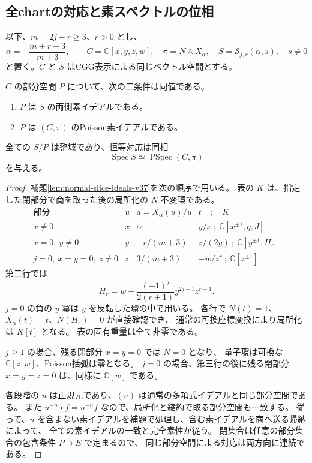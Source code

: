 \subsection{全chartの対応と素スペクトルの位相}

以下、$m=2j+r\ge3$、$r>0$ とし、
\[
 \alpha=-\frac{m+r+3}{m+3},\qquad
 C=\mathbb C[x,y,z,w],\quad
 \pi=N\wedge X_\alpha,\quad S=\mathcal S_{j,r}(\alpha,s),\quad s\ne0
\]
と置く。$C$ と $S$ はCGG表示による同じベクトル空間とする。

\begin{theorem}[素スペクトルの同一視]
\label{thm:prime-poisson-correspondence-v37}
$C$ の部分空間 $P$ について、次の二条件は同値である。
\begin{enumerate}
\item $P$ は $S$ の両側素イデアルである。
\item $P$ は $(C,\pi)$ のPoisson素イデアルである。
\end{enumerate}
全ての $S/P$ は整域であり、恒等対応は同相
\[
 \operatorname{Spec}S\simeq\operatorname{PSpec}(C,\pi)
\]
を与える。
\end{theorem}

\begin{proof}
補題\ref{lem:normal-slice-ideals-v37}を次の順序で用いる。
表の $K$ は、指定した閉部分で商を取った後の局所化の $N$ 不変環である。
\[
\begin{array}{c|c|c|c}
 \text{部分}&u& a=X_\alpha(u)/u&t\quad;\quad K\\\hline
 x\ne0&x&\alpha&y/x\ ;\ \mathbb C[x^{\pm1},q,J]\\
 x=0,\ y\ne0&y&-r/(m+3)&z/(2y)\ ;\ \mathbb C[y^{\pm1},H_r]\\
 j=0,\ x=y=0,\ z\ne0&z&3/(m+3)&-w/z^r\ ;\ \mathbb C[z^{\pm1}]
\end{array}
\]
第二行では
\[
 H_r=w+\frac{(-1)^j}{2(r+1)}y^{2j-1}z^{r+1}.
\]
$j=0$ の負の $y$ 冪は $y$ を反転した環の中で用いる。
各行で $N(t)=1$、$X_\alpha(t)=t$、$N(H_r)=0$ が直接確認でき、
通常の可換座標変換により局所化は $K[t]$ となる。
表の固有重量は全て非零である。

$j\ge1$ の場合、残る閉部分 $x=y=0$ では $N=0$ となり、
量子環は可換な $\mathbb C[z,w]$、Poisson括弧は零となる。
$j=0$ の場合、第三行の後に残る閉部分 $x=y=z=0$ は、同様に $\mathbb C[w]$ である。

各段階の $u$ は正規元であり、$(u)$ は通常の多項式イデアルと同じ部分空間である。
また $u^{-n}\star f=u^{-n}f$ なので、局所化と縮約で取る部分空間も一致する。
従って、$u$ を含まない素イデアルを補題で処理し、含む素イデアルを商へ送る帰納によって、
全ての素イデアルの一致と完全素性が従う。
閉集合は任意の部分集合の包含条件 $P\supset E$ で定まるので、
同じ部分空間による対応は両方向に連続である。
\end{proof}

